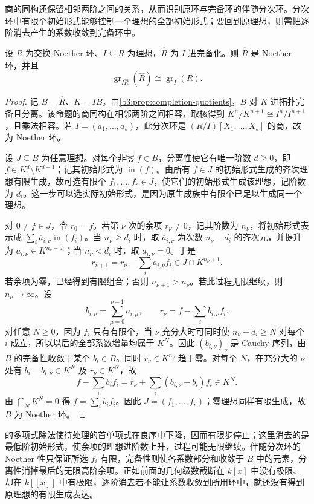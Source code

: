 商的同构还保留相邻两阶之间的关系，从而识别原环与完备环的伴随分次环。分次环中有限个初始形式能够控制一个理想的全部初始形式；要回到原理想，则需把逐阶消去产生的系数收敛到完备环中。

\begin{theorem}\label{b3:thm:completion-noetherian}
	设 \(R\) 为交换 Noether 环、\(I\subseteq R\) 为理想，\(\widehat R\) 为 \(I\) 进完备化。则 \(\widehat R\) 是 Noether 环，并且
	\[
		\operatorname{gr}_{I\widehat R}(\widehat R) \cong\operatorname{gr}_I(R).
	\]
\end{theorem}
\begin{proof}
	记 \(B=\widehat R\)、\(K=IB\)。由\cref{b3:prop:completion-quotients}，\(B\) 对 \(K\) 进拓扑完备且分离。该命题的商同构在相邻两阶之间相容，取核得到 \(K^n/K^{n+1}\cong I^n/I^{n+1}\)，且乘法相容。若 \(I=(a_1,\ldots,a_s)\)，此分次环是 \((R/I)[X_1,\ldots,X_s]\) 的商，故为 Noether 环。

	设 \(J\subseteq B\) 为任意理想。对每个非零 \(f\in B\)，分离性使它有唯一阶数 \(d\ge0\)，即 \(f\in K^d\setminus K^{d+1}\)；记其初始形式为 \(\operatorname{in}(f)\)。由所有 \(f\in J\) 的初始形式生成的齐次理想有限生成，故可选有限个 \(f_1,\ldots,f_r\in J\)，使它们的初始形式生成该理想，记阶数为 \(d_i\)。这一步可以选实际初始形式，是因为原生成族中有限个已足以生成同一个理想。

	对 \(0\ne f\in J\)，令 \(r_0=f\)。若第 \(\nu\) 次的余项 \(r_\nu\ne0\)，记其阶数为 \(n_\nu\)，将初始形式表示成 \(\sum_i\overline a_{i,\nu}\operatorname{in}(f_i)\)。当 \(n_\nu\ge d_i\) 时，取 \(\overline a_{i,\nu}\) 为次数 \(n_\nu-d_i\) 的齐次元，并提升为 \(a_{i,\nu}\in K^{n_\nu-d_i}\)；当 \(n_\nu<d_i\) 时，取 \(a_{i,\nu}=0\)。于是
	\[
		r_{\nu+1}=r_\nu-\sum_i a_{i,\nu}f_i \in J\cap K^{n_\nu+1}.
	\]
	若余项为零，已经得到有限组合；否则 \(n_{\nu+1}>n_\nu\)。若此过程无限继续，则 \(n_\nu\to\infty\)。设
	\[
		b_{i,\nu}=\sum_{\mu=0}^{\nu-1}a_{i,\mu}, \qquad r_\nu=f-\sum_i b_{i,\nu}f_i.
	\]
	对任意 \(N\ge0\)，因为 \(f_i\) 只有有限个，当 \(\nu\) 充分大时可同时使 \(n_\nu-d_i\ge N\) 对每个 \(i\) 成立，所以以后的全部系数增量均属于 \(K^N\)。因此 \((b_{i,\nu})_\nu\) 是 Cauchy 序列，由 \(B\) 的完备性收敛于某个 \(b_i\in B\)。同时 \(r_\nu\in K^{n_\nu}\) 趋于零。对每个 \(N\)，在充分大的 \(\nu\) 处有 \(b_i-b_{i,\nu}\in K^N\) 及 \(r_\nu\in K^N\)，故
	\[
		f-\sum_i b_if_i =r_\nu+\sum_i(b_{i,\nu}-b_i)f_i\in K^N.
	\]
	由 \(\bigcap_NK^N=0\) 得 \(f=\sum_i b_if_i\)。因此 \(J=(f_1,\ldots,f_r)\)；零理想同样有限生成，故 \(B\) 为 Noether 环。
\end{proof}

的多项式除法使待处理的首单项式在良序中下降，因而有限步停止；这里消去的是最低阶初始形式，使余项的理想进阶数上升，过程可能无限继续。伴随分次环的 Noether 性只保证所选 \(f_i\) 有限，完备性则使各系数部分和收敛于 \(B\) 中的元素，分离性消掉最后的无限高阶余项。正如前面的几何级数截断在 \(k[x]\) 中没有极限、却在 \(k[\![x]\!]\) 中有极限，逐阶消去若不能让系数收敛到所用环中，就还没有得到原理想的有限生成表达。
